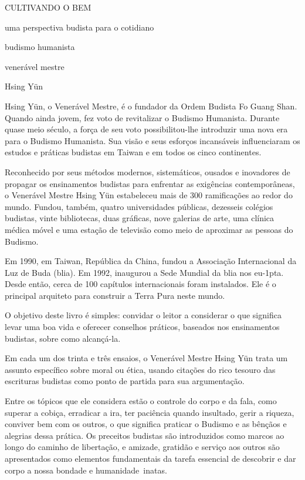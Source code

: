 CULTIVANDO O BEM
\stopbuffer

uma perspectiva budista para o cotidiano
\stopbuffer

budismo humanista
\stopbuffer

venerável mestre
\stopbuffer

\startbuffer[author]
Hsing Yün
\stopbuffer

Hsing Yün, o Venerável Mestre, é o fundador da Ordem Budista Fo Guang Shan.
Quando ainda jovem, fez voto de revi\-talizar o Budismo Humanista.
Durante quase meio século, a força de seu voto possibilitou-lhe introduzir uma nova era para o Budismo Humanista.
Sua visão e seus esforços incansáveis influenciaram os estudos e práticas budistas em Taiwan e em todos os cinco continentes.

Reconhecido por seus métodos modernos, sistemáticos, ousados e inovadores de propagar os ensinamentos budistas para enfrentar as exigências contemporâneas, o Venerável Mestre Hsing Yün estabeleceu mais de 300 ramificações ao redor do mundo.
Fundou, também, quatro universidades públicas, dezesseis colégios budistas, vinte bibliotecas, duas gráficas, nove galerias de arte, uma clínica médica móvel e uma estação de televisão como meio de aproximar as pessoas do Budismo.

Em 1990, em Taiwan, República da China, fundou a Associação Internacional da Luz de Buda ({\sc blia}).
Em 1992, inaugurou a Sede Mundial da {\sc blia} nos {\sc eu\kern-1pta.}
Desde então, cerca de 100 capítulos internacionais foram instalados.
Ele é o principal arquiteto para construir a Terra Pura neste mundo.
\stopbuffer


O objetivo deste livro é simples: convidar o leitor a considerar o que significa levar uma boa vida e oferecer conselhos práticos, baseados nos ensinamentos budistas, sobre como alcançá-la.

Em cada um dos trinta e três ensaios, o Venerável Mestre Hsing Yün trata um assunto específico sobre moral ou ética, usando citações do rico tesouro das escrituras budistas como ponto de partida para sua argumentação.

Entre os tópicos que ele considera estão o controle do corpo e da fala, como superar a cobiça, erradicar a ira, ter paciência quando insultado, gerir a riqueza, conviver bem com os outros, o que significa praticar o Budismo e as bênçãos e alegrias dessa prática.
Os preceitos budistas são introduzidos como marcos ao longo do caminho de libertação, e amizade, gratidão e serviço aos outros são apresentados como elementos fundamentais da tarefa essencial de descobrir e dar corpo a nossa bondade e humanidade~inatas.
\stopbuffer

